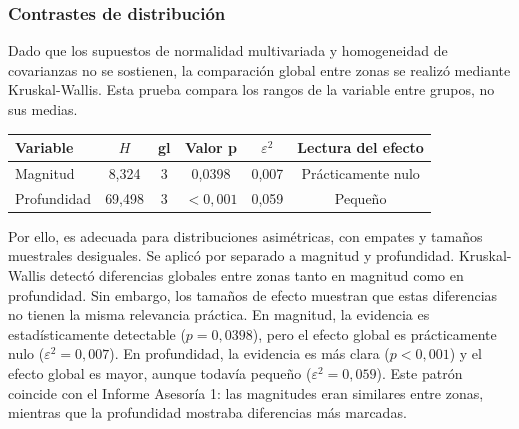 \documentclass[
  spanish,
  letterpaper,
  DIV=11,
  numbers=noendperiod]{scrartcl}
\begin{document}
\subsubsection{Contrastes de
distribución}\label{contrastes-de-distribuciuxf3n}

\noindent
\begin{minipage}[t]{0.45\textwidth}
\vspace{0pt}
Dado que los supuestos de normalidad multivariada y homogeneidad de covarianzas no se sostienen, la comparación global entre zonas se realizó mediante Kruskal-Wallis. Esta prueba compara los rangos de la variable entre grupos, no sus medias.
\end{minipage}\hfill
\begin{minipage}[t]{0.51\textwidth}
\vspace{0pt}
\begingroup
\scriptsize
\centering
\setlength{\tabcolsep}{0.8pt}
\renewcommand{\arraystretch}{0.82}
{}
\label{tbl-kruskal-mag-depth}
\hypertarget{dest-tbl-kruskal-mag-depth}{}
\begin{tabular*}{\linewidth}{@{\extracolsep{\fill}}lccccc@{}}
\toprule
Variable & $H$ & gl & Valor p & $\varepsilon^2$ & Lectura del efecto \\
\midrule
Magnitud & 8,324 & 3 & 0,0398 & 0,007 & Prácticamente nulo \\
Profundidad & 69,498 & 3 & $<0{,}001$ & 0,059 & Pequeño \\
\bottomrule
\end{tabular*}
\par\vspace{0.10em}
\endgroup
\end{minipage}
\par\vspace{-0.25em}

Por ello, es adecuada para distribuciones asimétricas, con empates y
tamaños muestrales desiguales. Se aplicó por separado a magnitud y
profundidad. Kruskal-Wallis detectó diferencias globales entre zonas
tanto en magnitud como en profundidad. Sin embargo, los tamaños de
efecto muestran que estas diferencias no tienen la misma relevancia
práctica. En magnitud, la evidencia es estadísticamente detectable
(\(p=0{,}0398\)), pero el efecto global es prácticamente nulo
(\(\varepsilon^2=0{,}007\)). En profundidad, la evidencia es más clara
(\(p<0{,}001\)) y el efecto global es mayor, aunque todavía pequeño
(\(\varepsilon^2=0{,}059\)). Este patrón coincide con el Informe
Asesoría 1: las magnitudes eran similares entre zonas, mientras que la
profundidad mostraba diferencias más marcadas.
\end{document}
